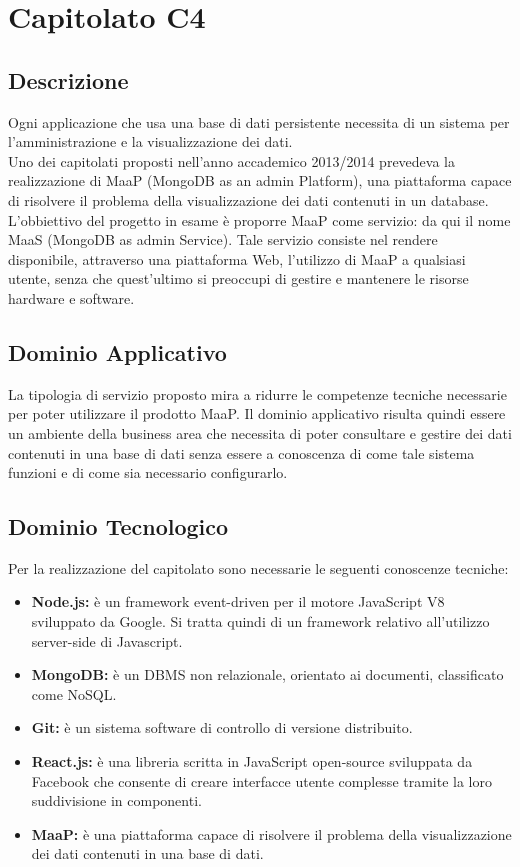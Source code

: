 \section{Capitolato C4}
\subsection{Descrizione}
Ogni applicazione che usa una base di dati persistente necessita di un sistema per l'amministrazione e la visualizzazione dei dati.\\ Uno dei capitolati proposti nell'anno accademico 2013/2014 prevedeva la realizzazione di MaaP (MongoDB as an admin Platform), una piattaforma capace di risolvere il problema della visualizzazione dei dati contenuti in un database.\\ 
L'obbiettivo del progetto in esame è proporre MaaP come servizio: da qui il nome MaaS (MongoDB as admin Service). Tale servizio consiste nel rendere disponibile, attraverso una piattaforma Web, l'utilizzo di MaaP a qualsiasi utente, senza che quest'ultimo si preoccupi di gestire e mantenere le risorse hardware e software. 

\subsection{Dominio Applicativo}
La tipologia di servizio proposto mira a ridurre le competenze tecniche necessarie per poter utilizzare il prodotto MaaP. Il dominio applicativo risulta quindi essere un ambiente della business area che necessita di poter consultare e gestire dei dati contenuti in una base di dati senza essere a conoscenza di come tale sistema funzioni e di come sia necessario configurarlo. 

\subsection{Dominio Tecnologico}
Per la realizzazione del capitolato sono necessarie le seguenti conoscenze tecniche:
\begin{itemize}
	\item \textbf{Node.js:} è un framework event-driven per il motore JavaScript V8 sviluppato da Google. Si tratta quindi di un framework relativo all'utilizzo server-side di Javascript. 
	\item \textbf{MongoDB:} è un DBMS non relazionale, orientato ai documenti, classificato come NoSQL. 
	\item \textbf{Git:} è un sistema software di controllo di versione distribuito. 
	\item \textbf{React.js:} è una libreria scritta in JavaScript open-source sviluppata da Facebook che consente di creare interfacce utente complesse tramite la loro suddivisione in componenti. 
	\item \textbf{MaaP:} è una piattaforma capace di risolvere il problema della visualizzazione dei dati contenuti in una base di dati.	
\end{itemize}

